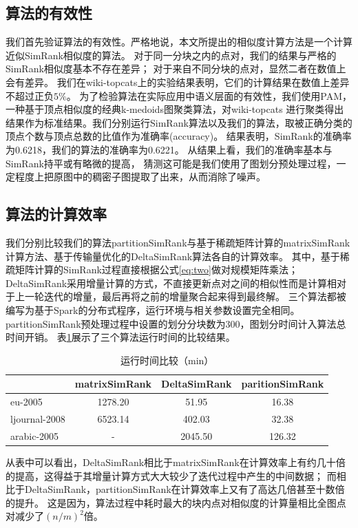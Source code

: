 \documentclass[master]{njuthesis}
\begin{document}
\subsection{算法的有效性}
我们首先验证算法的有效性。严格地说，本文所提出的相似度计算方法是一个计算近似SimRank相似度的算法。
对于同一分块之内的点对，我们的结果与严格的SimRank相似度基本不存在差异；
对于来自不同分块的点对，显然二者在数值上会有差异。
我们在wiki-topcats上的实验结果表明，它们的计算结果在数值上差异不超过正负$5\%$。
为了检验算法在实际应用中语义层面的有效性，我们使用PAM\cite{kaufman:clustering1990}，一种基于顶点相似度的经典k-medoids图聚类算法，对wiki-topcats
进行聚类得出结果作为标准结果。我们分别运行SimRank算法以及我们的算法，取被正确分类的顶点个数与顶点总数的比值作为准确率(accuracy)。
结果表明，SimRank的准确率为0.6218，我们的算法的准确率为0.6221。
从结果上看，我们的准确率基本与SimRank持平或有略微的提高，
猜测这可能是我们使用了图划分预处理过程，一定程度上把原图中的稠密子图提取了出来，从而消除了噪声。

\subsection{算法的计算效率}
我们分别比较我们的算法partitionSimRank与基于稀疏矩阵计算的matrixSimRank计算方法、基于传输量优化的DeltaSimRank算法各自的计算效率。
其中，基于稀疏矩阵计算的SimRank过程直接根据公式\ref{eq:two}做对规模矩阵乘法；
DeltaSimRank\cite{cao2012delta}采用增量计算的方式，不直接更新点对之间的相似性而是计算相对于上一轮迭代的增量，最后再将之前的增量聚合起来得到最终解。
三个算法都被编写为基于Spark的分布式程序，运行环境与相关参数设置完全相同。
partitionSimRank预处理过程中设置的划分分块数为300，图划分时间计入算法总时间开销。
表\ref{tab:cha3_time}展示了三个算法运行时间的比较结果。
\begin{table}[ht]
\caption{运行时间比较（min）}
\label{tab:cha3_time}
\centering
\begin{tabular}{|l|c|c|c|}
\hline
& \textbf{matrixSimRank} & \textbf{DeltaSimRank} & \textbf{paritionSimRank} \\
\hline
eu-2005 & \num{1278.20} & \num{51.95}          & \num{16.38}       \\
\hline
ljournal-2008     & \num{6523.14}  & \num{402.03 }          & \num{32.38}    \\
\hline
arabic-2005  & - & \num{2045.50}         & \num{126.32}    \\
\hline
\end{tabular}
\end{table}
从表中可以看出，DeltaSimRank相比于matrixSimRank在计算效率上有约几十倍的提高，这得益于其增量计算方式大大较少了迭代过程中产生的中间数据；
而相比于DeltaSimRank，partitionSimRank在计算效率上又有了高达几倍甚至十数倍的提升。
这是因为，算法过程中耗时最大的块内点对相似度的计算量相比全图点对减少了$(n/m)^2$倍。
\end{document}
